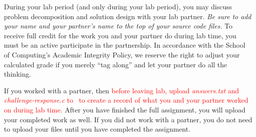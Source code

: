 During your lab period (and only during your lab period), you may discuss problem decomposition and solution design with your lab partner.
\textit{Be sure to add your name and your partner's name to the top of your source code files.}
To receive full credit for the work you and your partner do during lab time, you must be an active participate in the partnership.
In accordance with the School of Computing's Academic Integrity Policy, we reserve the right to adjust your calculated grade if you merely ``tag along'' and let your partner do all the thinking.

If you worked with a partner, then \textcolor{red}{before leaving lab, upload \textit{answers.txt} and \textit{challenge-response.c} to \filesubmission\ to create a record of what you and your partner worked on during lab time.}
After you have finished the full assignment, you will upload your completed work as well.
If you did not work with a partner, you do not need to upload your files until you have completed the assignment.